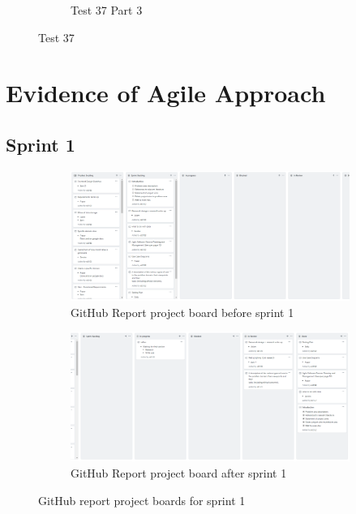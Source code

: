 \documentclass[10pt, notitlepage]{report}
\begin{document}
\begin{figure}[!h]
\begin{subfigure}{0.4\textwidth}
	\caption{Test 37 Part 3}
	\label{fig:test37-3}
\end{subfigure}
\caption{Test 37}
\label{fig:test37}
\end{figure}
\newpage
{}


\section{Evidence of Agile Approach}
\label{sec:agileapp}

\subsection{Sprint 1}

\begin{figure}[!h]
\centering
\begin{subfigure}{\textwidth}
	\centering	
	\includegraphics[width=1\linewidth]{git-report-1-before.png}
	\caption{GitHub Report project board before sprint 1}
	\label{fig:agileapp-rb1}
\end{subfigure}
\begin{subfigure}{\textwidth}
	\centering	
	\includegraphics[width=1\linewidth]{git-report-1-after.png}
	\caption{GitHub Report project board after sprint 1}
	\label{fig:agileapp-ra1}
\end{subfigure}

\caption{GitHub report project boards for sprint 1}

\end{figure}
\end{document}
